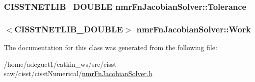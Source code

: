 \hypertarget{classnmr_fn_jacobian_solver_a674186e39a43be30ebf759fc267feb64}{
\subsubsection[{Tolerance}]{\setlength{\rightskip}{0pt plus 5cm}C\-I\-S\-S\-T\-N\-E\-T\-L\-I\-B\-\_\-\-D\-O\-U\-B\-L\-E nmr\-Fn\-Jacobian\-Solver\-::\-Tolerance\hspace{0.3cm}{\ttfamily [protected]}}}\label{classnmr_fn_jacobian_solver_a674186e39a43be30ebf759fc267feb64}
\hypertarget{classnmr_fn_jacobian_solver_aa3feee6872edf26213e56a7309aaa2bf}{
\subsubsection[{Work}]{$<$C\-I\-S\-S\-T\-N\-E\-T\-L\-I\-B\-\_\-\-D\-O\-U\-B\-L\-E$>$ nmr\-Fn\-Jacobian\-Solver\-::\-Work\hspace{0.3cm}{\ttfamily [protected]}}}\label{classnmr_fn_jacobian_solver_aa3feee6872edf26213e56a7309aaa2bf}


The documentation for this class was generated from the following file\-:\begin{DoxyCompactItemize}
\item 
/home/adeguet1/catkin\-\_\-ws/src/cisst-\/saw/cisst/cisst\-Numerical/\hyperlink{nmr_fn_jacobian_solver_8h}{nmr\-Fn\-Jacobian\-Solver.\-h}\end{DoxyCompactItemize}
